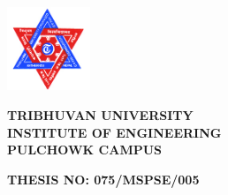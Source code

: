 

\renewcommand{\baselinestretch}{1.5}


\begin{titlepage}
\begin{center}

\begin{center}
\includegraphics[width=25mm,height=25mm,keepaspectratio]{Figures/TU_dark_logo.jpeg}\\ %
\end{center}


\begin{center}
{\bfseries \normalsize \MakeUppercase{Tribhuvan University \\ \vspace{0.15cm}
    Institute of Engineering\\ \vspace{0.15cm}
    Pulchowk Campus}}
\end{center}


\vspace{1cm}


 \begin{flushleft}
 \textbf{{\normalsize \raggedleft THESIS NO: 075/MSPSE/005}} %
 \end{flushleft}


{\bfseries \normalsize \ttitle\par}\vspace{1cm} %
 

\end{center}
\end{titlepage}
